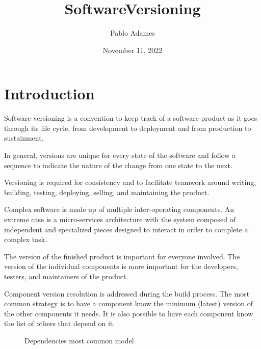 \documentclass[12pt,dvipsnames]{article}
\title{SoftwareVersioning}
\author{Pablo Adames}
\date{November 11, 2022}
\begin{document}
\maketitle

\section{Introduction}

Software versioning is a convention to keep track of a software product as it goes through its life cycle, from development to deployment and from production to sustainment\cite{Wikipedia_software_version_short}.

In general, versions are unique for every state of the software and follow a sequence to indicate the nature of the change from one state to the next.

Versioning is required for consistency and to facilitate teamwork around writing, building, testing, deploying, selling, and maintaining the product. 


Complex software is made up of multiple inter-operating components. 
An extreme case is a micro-services architecture with the system composed of independent and specialized pieces designed to interact in order to complete a complex task.

The version of the finished product is important for everyone involved. 
The version of the individual components is more important for the developers, testers, and maintainers of the product.

Component version resolution is addressed during the build process.
The most common strategy is to have a component know the minimum (latest) version of the other components it needs. 
It is also possible to have each component know the list of others that depend on it.  

\begin{figure}
    \centering
    \caption{Dependencies most common model}
    \label{fig:my_label}
\end{figure}
\end{document}
